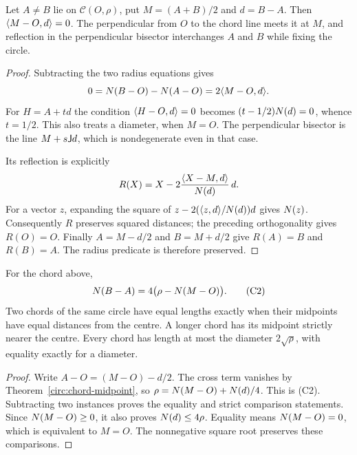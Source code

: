 \begin{theorem}
\label{circ:chord-midpoint}
Let $A\ne B$ lie on $\mathcal C(O,\rho)$, put $M=(A+B)/2$ and $d=B-A$.
Then $\langle M-O,d\rangle=0$.  The perpendicular from $O$ to the chord line meets
it at $M$, and reflection in the perpendicular bisector interchanges $A$
and $B$ while fixing the circle.
\end{theorem}
\begin{proof}
Subtracting the two radius equations gives
\[
 0=N(B-O)-N(A-O)=2\langle M-O,d\rangle.
\]
For $H=A+td$ the condition $\langle H-O,d\rangle=0$ becomes
$(t-1/2)N(d)=0$, whence $t=1/2$.  This also treats a diameter,
when $M=O$.  The perpendicular bisector is the line
$M+s\mathsf J d$, which is nondegenerate even in that case.

Its reflection is explicitly
\[
 R(X)=X-2\frac{\langle X-M,d\rangle}{N(d)}\,d.
\]
For a vector $z$, expanding the square of
$z-2(\langle z,d\rangle/N(d))d$ gives $N(z)$.
Consequently $R$ preserves squared distances; the preceding orthogonality
gives $R(O)=O$.  Finally $A=M-d/2$ and $B=M+d/2$ give $R(A)=B$ and
$R(B)=A$.  The radius predicate is therefore preserved.
\end{proof}

\begin{theorem}
\label{circ:chord-distance}
For the chord above,
\[
 N(B-A)=4\bigl(\rho-N(M-O)\bigr).       \tag{C2}
\]
Two chords of the same circle have equal lengths exactly when their
midpoints have equal distances from the centre.  A longer chord has its
midpoint strictly nearer the centre.  Every chord has length at most the
diameter $2\sqrt\rho$, with equality exactly for a diameter.
\end{theorem}
\begin{proof}
Write $A-O=(M-O)-d/2$.  The cross term vanishes by
Theorem~\ref{circ:chord-midpoint}, so
$\rho=N(M-O)+N(d)/4$.  This is (C2).
Subtracting two instances proves the equality and strict comparison
statements.  Since $N(M-O)\ge0$, it also proves
$N(d)\le4\rho$.  Equality means $N(M-O)=0$, which is equivalent
to $M=O$.  The nonnegative square root preserves these comparisons.
\end{proof}

